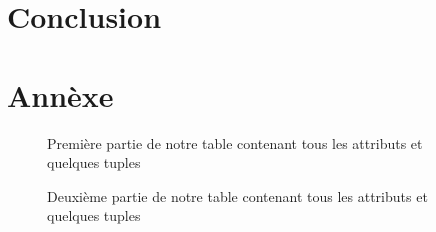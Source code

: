 \documentclass[a4paper,sffamily,12pt]{article}
\begin{document}
			\vspace{0.5cm}

		\section{Conclusion}

			\vspace{0.5cm}
			
			
			

			\newpage

			\section{Annèxe}
							
				\begin{figure}[!h]		
					\centering
					\caption{Première partie de notre table contenant tous les attributs et quelques tuples}
					\label{table_p1}	
				\end{figure}			

				\begin{figure}[!h]
					\centering						
					\caption{Deuxième partie de notre table contenant tous les attributs et quelques tuples}
					\label{table_p2}	
				\end{figure}			
\end{document}
